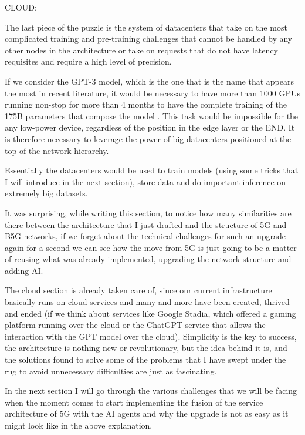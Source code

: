 \bigskip
\noindent
CLOUD:
\label{ssec:cloud}

The last piece of the puzzle is the system of datacenters that take on the most complicated training
and pre-training challenges that cannot be handled by any other nodes in the architecture or take on
requests that do not have latency requisites and require a high level of precision.

If we consider the GPT-3 model, which is the one that is the name that appears the most in recent literature, it would be necessary to have more than 1000 GPUs running non-stop for more than
4 months to have the complete training of the 175B parameters that compose the model \cite{gaisnet}.
This task would be impossible for the any low-power device, regardless of the position in the edge
layer or the END. It is therefore necessary to leverage the power of big datacenters positioned at
the top of the network hierarchy.

Essentially the datacenters would be used to train models (using some tricks that I will introduce
in the next section), store data and do important inference on extremely big datasets.

\bigskip
It was surprising, while writing this section, to notice how many similarities are there between the
architecture that I just drafted and the structure of 5G and B5G networks, if we forget about the
technical challenges for such an upgrade again for a second we can see how the move from 5G is just going
to be a matter of reusing what was already implemented, upgrading the network structure and adding
AI.

The cloud section is already taken care of, since our current infrastructure basically runs on cloud
services and many and more have been created, thrived and ended (if we think about services like
Google Stadia, which offered a gaming platform running over the cloud or the ChatGPT service that
allows the interaction with the GPT model over the cloud). Simplicity is the key to success, the
architecture is nothing new or revolutionary, but the idea behind it is, and the solutions found to
solve some of the problems that I have swept under the rug to avoid unnecessary difficulties are
just as fascinating.

In the next section I will go through the various challenges that we will be facing when the moment
comes to start implementing the fusion of the service architecture of 5G with the AI agents and why
the upgrade is not as easy as it might look like in the above explanation.
